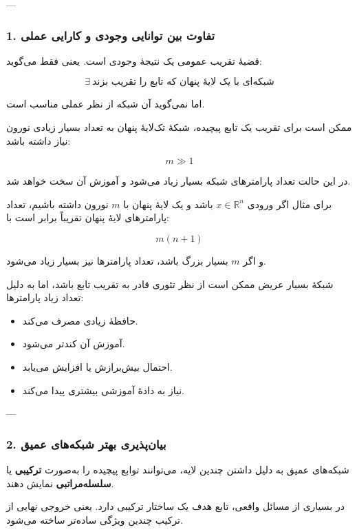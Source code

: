 \documentclass[12pt,a4paper]{article}
\begin{document}
---

\subsubsection{1. تفاوت بین توانایی وجودی و کارایی عملی}

قضیهٔ تقریب عمومی یک نتیجهٔ وجودی است. یعنی فقط می‌گوید:

\[
\exists \ \text{شبکه‌ای با یک لایهٔ پنهان که تابع را تقریب بزند}
\]

اما نمی‌گوید آن شبکه از نظر عملی مناسب است.

ممکن است برای تقریب یک تابع پیچیده، شبکهٔ تک‌لایهٔ پنهان به تعداد بسیار زیادی نورون نیاز داشته باشد:

\[
m \gg 1
\]

در این حالت تعداد پارامترهای شبکه بسیار زیاد می‌شود و آموزش آن سخت خواهد شد.

برای مثال اگر ورودی \(x\in\mathbb{R}^n\) باشد و یک لایهٔ پنهان با \(m\) نورون داشته باشیم، تعداد پارامترهای لایهٔ پنهان تقریباً برابر است با:

\[
m(n+1)
\]

و اگر \(m\) بسیار بزرگ باشد، تعداد پارامترها نیز بسیار زیاد می‌شود.

\begin{tcolorbox}[
	colback=softpink,
	colframe=softred,
	title=مشکل شبکهٔ بسیار عریض
	]
	شبکهٔ بسیار عریض ممکن است از نظر تئوری قادر به تقریب تابع باشد، اما به دلیل تعداد زیاد پارامترها:
	
	\begin{itemize}
		\item حافظهٔ زیادی مصرف می‌کند.
		\item آموزش آن کندتر می‌شود.
		\item احتمال بیش‌برازش یا  افزایش می‌یابد.
		\item نیاز به دادهٔ آموزشی بیشتری پیدا می‌کند.
	\end{itemize}
\end{tcolorbox}

---

\subsubsection{2. بیان‌پذیری بهتر شبکه‌های عمیق}

شبکه‌های عمیق به دلیل داشتن چندین لایه، می‌توانند توابع پیچیده را به‌صورت \textbf{ترکیبی} یا \textbf{سلسله‌مراتبی} نمایش دهند.

در بسیاری از مسائل واقعی، تابع هدف یک ساختار ترکیبی دارد. یعنی خروجی نهایی از ترکیب چندین ویژگی ساده‌تر ساخته می‌شود.
\end{document}
